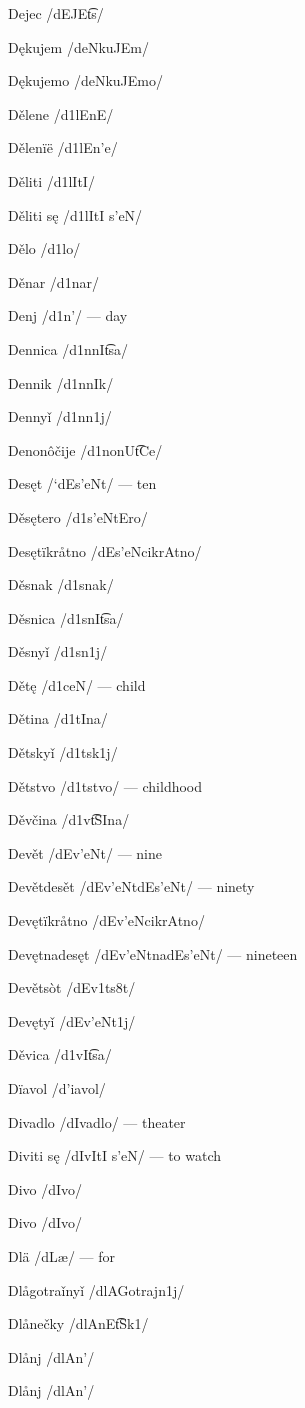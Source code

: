 Dejec /dEJE\t{ts}/

Dękujem /deNkuJEm/

Dękujemo /deNkuJEmo/

Dělene /d1lEnE/

Dělenïë /d1lEn’e/

Děliti /d1lItI/

Děliti sę /d1lItI s’eN/

Dělo /d1lo/

Děnar /d1nar/

Denj /d1n’/ — day

Dennica /d1nnI\t{ts}a/

Dennik /d1nnIk/

Dennyǐ /d1nn1j/

Denonôčije /d1nonU\t{tC}e/

Desęt /`dEs’eNt/ — ten

Děsętero /d1s’eNtEro/

Desętïkråtno /dEs’eNcikrAtno/

Děsnak /d1snak/

Děsnica /d1snI\t{ts}a/

Děsnyǐ /d1sn1j/

Dětę /d1ceN/ — child

Dětina /d1tIna/

Dětskyǐ /d1tsk1j/

Dětstvo /d1tstvo/ — childhood

Děvčina /d1v\t{tS}Ina/

Devět /dEv’eNt/ — nine

Devětdesět /dEv’eNtdEs’eNt/ — ninety

Devętïkråtno /dEv’eNcikrAtno/

Devętnadesęt /dEv’eNtnadEs’eNt/ — nineteen

Devětsòt /dEv1ts8t/

Devętyǐ /dEv’eNt1j/

Děvica /d1vI\t{ts}a/

Dïavol /d’iavol/

Divadlo /dIvadlo/ — theater

Diviti sę /dIvItI s’eN/ — to watch

Divo /dIvo/

Divo /dIvo/

Dlä /dLæ/ — for

Dlågotraǐnyǐ /dlAGotrajn1j/

Dlånečky /dlAnE\t{tS}k1/

Dlånj /dlAn’/

Dlånj /dlAn’/

